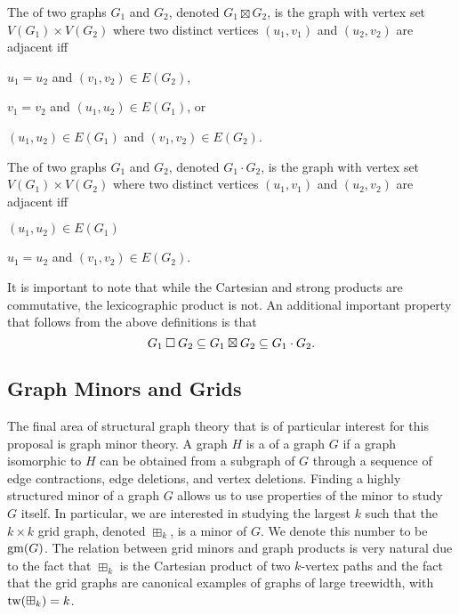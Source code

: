 \documentclass[../main.tex]{subfiles}
\begin{document}
The  of two graphs $G_1$ and $G_2$, denoted $G_1 \boxtimes G_2$, is the graph with vertex set $V(G_1) \times V(G_2)$ where two distinct vertices $(u_1, v_1)$ and $(u_2, v_2)$ are adjacent iff 
\begin{compactitem}
	\item $u_1 = u_2$ and $(v_1, v_2) \in E(G_2)$, 
	\item $v_1 = v_2$ and $(u_1, u_2) \in E(G_1)$, or
	\item $(u_1, u_2) \in E(G_1)$ and $(v_1, v_2) \in E(G_2)$.
\end{compactitem}

The  of two graphs $G_1$ and $G_2$, denoted $G_1 \cdot G_2$, is the graph with vertex set $V(G_1) \times V(G_2)$ where two distinct vertices $(u_1, v_1)$ and $(u_2, v_2)$ are adjacent iff
\begin{compactitem}
	\item $(u_1, u_2) \in E(G_1)$
	\item $u_1 = u_2$ and $(v_1, v_2) \in E(G_2)$.
\end{compactitem}

It is important to note that while the Cartesian and strong products are commutative, the lexicographic product is not. An additional important property that follows from the above definitions is that $$G_1\mathbin{\Box} G_2 \subseteq G_1\boxtimes G_2 \subseteq G_1 \cdot G_2.$$


\subsection{Graph Minors and Grids}
The final area of structural graph theory that is of particular interest for this proposal is graph minor theory. A graph $H$ is a  of a graph $G$ if a graph isomorphic to $H$ can be obtained from a subgraph of $G$ through a sequence of edge contractions, edge deletions, and vertex deletions. Finding a highly structured minor of a graph $G$ allows us to use properties of the minor to study $G$ itself. In particular, we are interested in studying the largest $k$ such that the $k\times k$ grid graph, denoted $\boxplus_k$, is a minor of $G$. We denote this number to be $\operatorname{gm}(G)$. The relation between grid minors and graph products is very natural due to the fact that $\boxplus_k$ is the Cartesian product of two $k$-vertex paths and the fact that the grid graphs are canonical examples of graphs of large treewidth, with $\operatorname{tw}(\boxplus_k)=k$.

	
	
\end{document}
